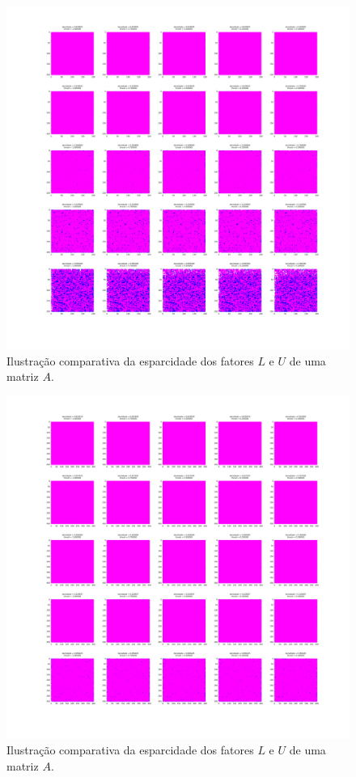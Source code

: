 \documentclass[12pt,a4paper]{article}
\begin{document}
\begin{figure}[!htb]
    \begin{center}
        \includegraphics[width=\textwidth, trim=300 300 250 100, clip]{src/dim200.png}
    \end{center}
    \caption{Ilustração comparativa da esparcidade dos fatores $L$ e $U$ de uma
    matriz $A$.}
    \label{fig:dim200}
\end{figure}
\begin{figure}[!htb]
    \begin{center}
        \includegraphics[width=\textwidth, trim=300 300 250 100, clip]{src/dim400.png}
    \end{center}
    \caption{Ilustração comparativa da esparcidade dos fatores $L$ e $U$ de uma
    matriz $A$.}
    \label{fig:dim400}
\end{figure}
\end{document}
